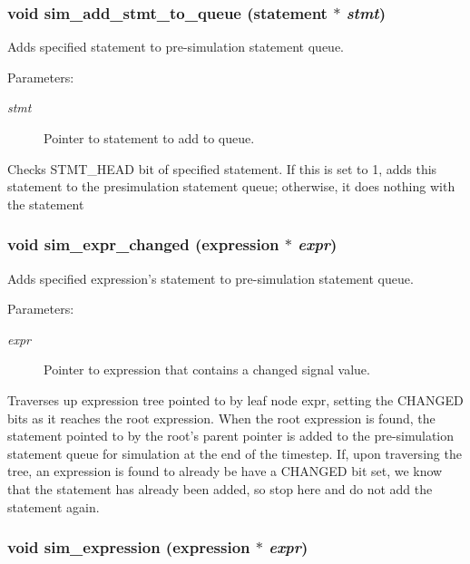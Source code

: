 \subsubsection{\setlength{\rightskip}{0pt plus 5cm}void sim\_\-add\_\-stmt\_\-to\_\-queue ({\bf statement} $\ast$ {\em stmt})}\label{sim_8c_a6}


Adds specified statement to pre-simulation statement queue. 

\begin{Desc}
\item[Parameters:]
\begin{description}
\item[{\em stmt}]Pointer to statement to add to queue.\end{description}
\end{Desc}
Checks STMT\_\-HEAD bit of specified statement. If this is set to 1, adds this statement to the presimulation statement queue; otherwise, it does nothing with the statement 
\subsubsection{\setlength{\rightskip}{0pt plus 5cm}void sim\_\-expr\_\-changed ({\bf expression} $\ast$ {\em expr})}\label{sim_8c_a5}


Adds specified expression's statement to pre-simulation statement queue. 

\begin{Desc}
\item[Parameters:]
\begin{description}
\item[{\em expr}]Pointer to expression that contains a changed signal value.\end{description}
\end{Desc}
Traverses up expression tree pointed to by leaf node expr, setting the CHANGED bits as it reaches the root expression. When the root expression is found, the statement pointed to by the root's parent pointer is added to the pre-simulation statement queue for simulation at the end of the timestep. If, upon traversing the tree, an expression is found to already be have a CHANGED bit set, we know that the statement has already been added, so stop here and do not add the statement again. 
\subsubsection{\setlength{\rightskip}{0pt plus 5cm}void sim\_\-expression ({\bf expression} $\ast$ {\em expr})}\label{sim_8c_a9}



